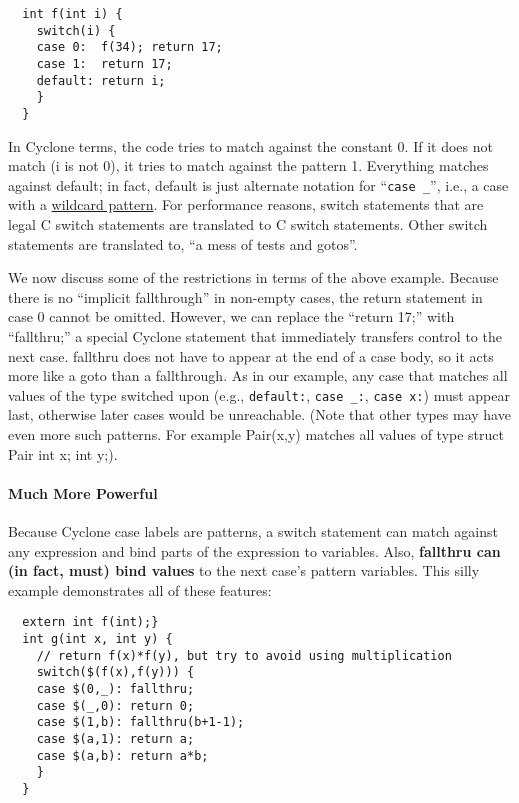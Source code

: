 \begin{verbatim}
  int f(int i) {
    switch(i) {
    case 0:  f(34); return 17;
    case 1:  return 17;
    default: return i;
    }
  }
\end{verbatim}

In Cyclone terms, the code tries to match against the constant 0.  If
it does not match (i is not 0), it tries to match against the pattern
1.  Everything matches against default; in fact, default is just
alternate notation for ``\texttt{case _}'', i.e., a case with a
\hyperlink{wild_pat}{wildcard pattern}.  For performance reasons,
switch statements that are legal C switch statements are translated to
C switch statements.  Other switch statements are translated to,
``a mess of tests and gotos''.

We now discuss some of the restrictions in terms of the above example.
Because there is no ``implicit fallthrough'' in non-empty cases, the
return statement in case 0 cannot be omitted.  However, we can replace
the ``return 17;'' with ``fallthru;'' a special Cyclone statement that
immediately transfers control to the next case.  fallthru does not
have to appear at the end of a case body, so it acts more like a goto
than a fallthrough.  As in our example, any case that matches all
values of the type switched upon (e.g., \texttt{default:},
\texttt{case _:},
\texttt{case x:}) must appear last, otherwise later cases would be
unreachable.  (Note that other types may have even more such patterns.
For example Pair(x,y) matches all values of type struct Pair {int x;
int y};).

\paragraph{Much More Powerful}

Because Cyclone case labels are patterns, a switch statement can match
against any expression and bind parts of the expression to variables.
Also, \textbf{fallthru can (in fact, must) bind values} to the next
case's pattern variables.  This silly example demonstrates all of
these features:

\begin{verbatim}
  extern int f(int);}
  int g(int x, int y) {
    // return f(x)*f(y), but try to avoid using multiplication
    switch($(f(x),f(y))) {
    case $(0,_): fallthru;
    case $(_,0): return 0;
    case $(1,b): fallthru(b+1-1);
    case $(a,1): return a;
    case $(a,b): return a*b;
    }
  }
\end{verbatim}

